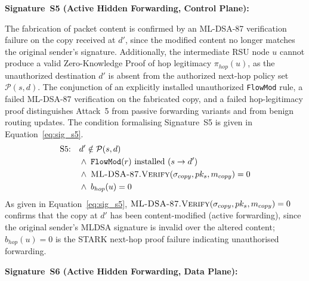 \documentclass[12pt, a4paper]{report}
\begin{document}
\textbf{Signature~S5 (Active Hidden Forwarding, Control Plane):}

The fabrication of packet content is confirmed by an ML-DSA-87 verification
failure on the copy received at $d'$, since the modified content no longer
matches the original sender's signature.
Additionally, the intermediate RSU node $u$ cannot produce a valid
Zero-Knowledge Proof of hop legitimacy $\pi_{hop}(u)$, as the unauthorized
destination $d'$ is absent from the authorized next-hop policy set
$\mathcal{P}(s,d)$.
The conjunction of an explicitly installed unauthorized \texttt{FlowMod}
rule, a failed ML-DSA-87 verification on the fabricated copy, and a failed
hop-legitimacy proof distinguishes Attack~5 from passive forwarding variants
and from benign routing updates.
The condition formalising Signature~S5 is given in
Equation~\eqref{eq:sig_s5}.
\begin{equation}
\begin{aligned}
\text{S5:}\quad
  & d' \notin \mathcal{P}(s,d) \\
  & \wedge\; \texttt{FlowMod}(r)
    \text{ installed } (s \to d') \\
  & \wedge\; \textsc{ML-DSA-87.Verify}(
    \sigma_{copy}, pk_s, m_{copy}) = 0 \\
  & \wedge\; b_{hop}(u) = 0
\end{aligned}
\label{eq:sig_s5}
\end{equation}
As given in Equation~\eqref{eq:sig_s5},
$\textsc{ML-DSA-87.Verify}(\sigma_{copy}, pk_s,
m_{copy}) = 0$ confirms that the copy at $d'$
has been content-modified (active forwarding),
since the original sender's \ac{MLDSA} signature
is invalid over the altered content;
$b_{hop}(u) = 0$ is the \ac{STARK} next-hop
proof failure indicating unauthorised forwarding.


\textbf{Signature~S6 (Active Hidden Forwarding, Data Plane):}
\end{document}
